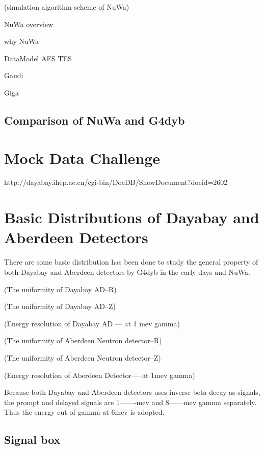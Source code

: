 (simulation algorithm scheme of NuWa)





NuWa overview

why NuWa

DataModel AES TES

Gaudi

Giga


\subsection {Comparison of NuWa and G4dyb}





\section {Mock Data Challenge}

http://dayabay.ihep.ac.cn/cgi-bin/DocDB/ShowDocument?docid=2602


\section {Basic Distributions of Dayabay and Aberdeen Detectors}

There are some basic distribution has been done to study the general
property of both Dayabay and Aberdeen detectors by G4dyb in the early
days and NuWa.


(The uniformity of Dayabay AD--R)




(The uniformity of Dayabay AD--Z)




(Energy resolution of Dayabay AD --- at 1 mev gamma)




(The uniformity of Aberdeen Neutron detector--R)




(The uniformity of Aberdeen Neutron detector--Z)




(Energy resolution of Aberdeen Detector-----at 1mev gamma)


Because both Dayabay and Aberdeen detectors uses inverse
beta decay as signals, the prompt and delayed signals are
1-------mev and 8------mev gamma separately. Thus
the energy cut of gamma at 6mev is adopted.


\subsection {Signal box}

